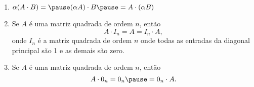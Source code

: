 \documentclass{beamer}
\begin{document}
    \begin{frame}
        \begin{proposicao}
            \begin{enumerate}[label={\roman*})]
                \conti
                \item $\alpha(A\cdot B) = \pause (\alpha A)\cdot B \pause = A \cdot(\alpha B)$\pause
                \item Se $A$ é uma matriz quadrada de ordem $n$, \pause então \[A\cdot I_n = A = I_n\cdot A,\] \pause onde $I_n$ é a matriz quadrada de ordem $n$ \pause onde todas as entradas da diagonal principal são 1 \pause e as demais são zero.\pause
                \item Se $A$ é uma matriz quadrada de ordem $n$, \pause então \[A\cdot0_n = 0_n \pause = 0_n\cdot A.\]
            \end{enumerate}
        \end{proposicao}
    \end{frame}
\end{document}
